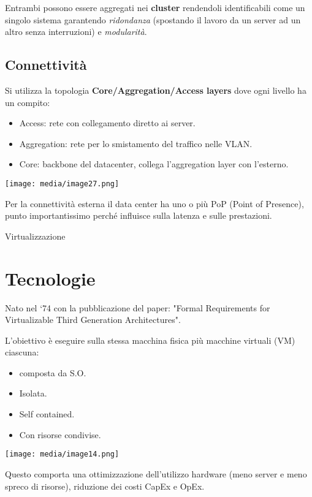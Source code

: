 Entrambi possono essere aggregati nei \textbf{cluster} rendendoli
identificabili come un singolo sistema garantendo \emph{ridondanza}
(spostando il lavoro da un server ad un altro senza interruzioni) e
\emph{modularità}.

\subsection{Connettività}\label{connettivituxe0}

Si utilizza la topologia \textbf{Core/Aggregation/Access layers} dove
ogni livello ha un compito:

\begin{itemize}
\item
  Access: rete con collegamento diretto ai server.
\item
  Aggregation: rete per lo smistamento del traffico nelle VLAN.
\item
  Core: backbone del datacenter, collega l'aggregation layer con
  l'esterno.
\end{itemize}

\texttt{[image: media/image27.png]}

Per la connettività esterna il data center ha uno o più PoP (Point of
Presence), punto importantissimo perché influisce sulla latenza e sulle
prestazioni.

Virtualizzazione

\section{Tecnologie}\label{tecnologie}

Nato nel `74 con la pubblicazione del paper: "Formal Requirements for
Virtualizable Third Generation Architectures".

L'obiettivo è eseguire sulla stessa macchina fisica più macchine
virtuali (VM) ciascuna:

\begin{itemize}
\item
  composta da S.O.
\item
  Isolata.
\item
  Self contained.
\item
  Con risorse condivise.
\end{itemize}

\texttt{[image: media/image14.png]}

Questo comporta una ottimizzazione dell'utilizzo hardware (meno server e
meno spreco di risorse), riduzione dei costi CapEx e OpEx.

